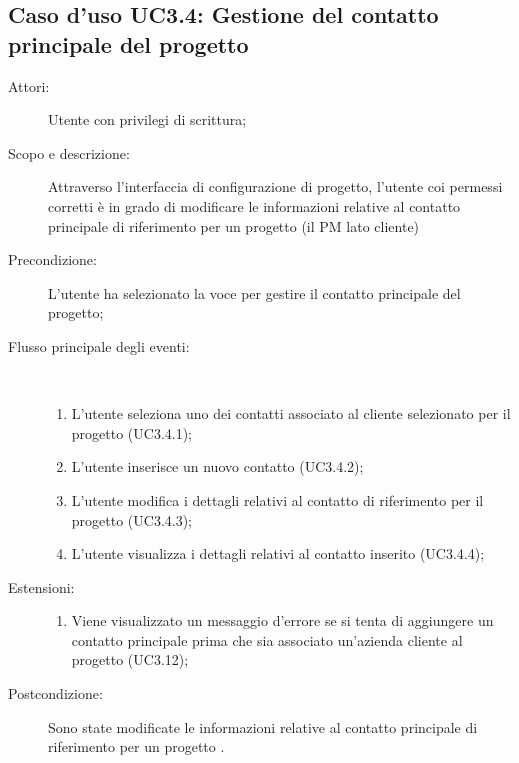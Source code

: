 \documentclass[12pt,a4paper,twoside,openright,english]{book}
\begin{document}
\subsection{Caso d'uso UC3.4: Gestione del contatto principale del progetto}\begin{description}
	\item[Attori:] Utente con privilegi di scrittura;
	\item[Scopo e descrizione:] Attraverso l’interfaccia di configurazione di progetto, l’utente coi permessi corretti è in grado di modificare le informazioni relative al contatto principale di riferimento per un progetto (il PM lato cliente)
	\item[Precondizione:] L'utente ha selezionato la voce per gestire il contatto principale del progetto;
	
	\item[Flusso principale degli eventi:] \ 
	\begin{enumerate}
		\item L’utente seleziona uno dei contatti associato al cliente selezionato per il progetto  (UC3.4.1);
		\item L’utente inserisce un nuovo contatto  (UC3.4.2);
		\item L’utente modifica i dettagli relativi al contatto di riferimento per il progetto  (UC3.4.3);
		\item L’utente visualizza i dettagli relativi al contatto inserito  (UC3.4.4);
		
	\end{enumerate}
	\item[Estensioni:]
	\begin{enumerate}
		\item Viene visualizzato un messaggio d'errore se si tenta di aggiungere un contatto principale prima che sia associato un'azienda cliente al progetto (UC3.12);
		
	\end{enumerate}
	\item[Postcondizione:] Sono state modificate le informazioni relative al contatto principale di riferimento per un progetto .
\end{description}

\hypertarget{UC3.5}{}
\end{document}
